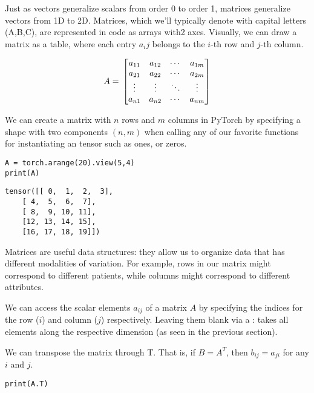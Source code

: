 \documentclass[]{article}
\begin{document}
Just as vectors generalize scalars from order 0 to order 1, matrices generalize vectors from 1D to 2D. Matrices, which we’ll typically denote with capital letters (A,B,C), are represented in code as arrays with2 axes. Visually, we can draw a matrix as a table, where each entry $ a_ij $ belongs to the $ i $-th row and $ j $-th column.

\begin{equation} \label{}
A = \\
\begin{bmatrix}
a_{11} & a_{12} & \cdots & a_{1m} \\
a_{21} & a_{22} & \cdots & a_{2m} \\
\vdots & \vdots & \ddots & \vdots \\
a_{n1} & a_{n2} & \cdots & a_{nm}
\end{bmatrix}
\end{equation}

We can create a matrix with $ n $ rows and $ m $ columns in PyTorch by specifying a shape with two components $ (n,m) $ when calling any of our favorite functions for instantiating an tensor such as ones, or zeros.

\begin{verbatim}
A = torch.arange(20).view(5,4)
print(A)
\end{verbatim}

\begin{verbatim}
tensor([[ 0,  1,  2,  3],
	[ 4,  5,  6,  7],
	[ 8,  9, 10, 11],
	[12, 13, 14, 15],
	[16, 17, 18, 19]])
\end{verbatim}

Matrices are useful data structures: they allow us to organize data that has different modalities of variation. For example, rows in our matrix might correspond to different patients, while columns might correspond to different attributes.

We can access the scalar elements $ a_{ij} $ of a matrix $ A $ by specifying the indices for the row ($ i $) and column ($ j $) respectively. Leaving them blank via a : takes all elements along the respective dimension (as seen in the previous section).

We can transpose the matrix through T. That is, if $ B = A^T $, then $ b_{ij} = a_{ji} $ for any $ i $ and $ j $.

\begin{verbatim}
print(A.T)
\end{verbatim}
\end{document}
